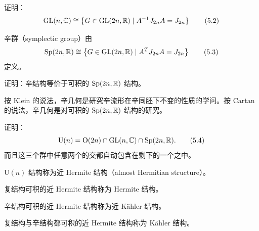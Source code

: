 \begin{exercise}
证明：
\begin{equation}
    \mathrm{GL}(n,\mathbb{C})\cong\left\{G\in\mathrm{GL}(2n,\mathbb{R})\mid A^{-1}J_{2n}A=J_{2n}\right\} \tag{5.2}
\end{equation}
\end{exercise}


\begin{definition}
辛群（symplectic group）由
\begin{equation}
    \mathrm{Sp}(2n,\mathbb{R})\cong\left\{G\in\mathrm{GL}(2n,\mathbb{R})\mid A^{T}J_{2n}A=J_{2n}\right\} \tag{5.3}
\end{equation}
定义。
\end{definition}

\begin{exercise}
证明：辛结构等价于可积的 $\mathrm{Sp}(2n,\mathbb{R})$ 结构。
\end{exercise}

按 Klein 的说法，辛几何是研究辛流形在辛同胚下不变的性质的学问。按 Cartan 的说法，辛几何是对可积的 $\mathrm{Sp}(2n,\mathbb{R})$ 结构的研究。

\begin{exercise}
证明：
\begin{equation}
    \mathrm{U}(n)=\mathrm{O}(2n)\cap\mathrm{GL}(n,\mathbb{C})\cap\mathrm{Sp}(2n,\mathbb{R}). \tag{5.4}
\end{equation}
而且这三个群中任意两个的交都自动包含在剩下的一个之中。
\end{exercise}

\begin{definition}
$\mathrm{U}(n)$ 结构称为近 Hermite 结构（almost Hermitian structure）。
\end{definition}

\begin{definition}
复结构可积的近 Hermite 结构称为 Hermite 结构。
\end{definition}

\begin{definition}
辛结构可积的近 Hermite 结构称为近 Kähler 结构。
\end{definition}

\begin{definition}
复结构与辛结构都可积的近 Hermite 结构称为 Kähler 结构。
\end{definition}

